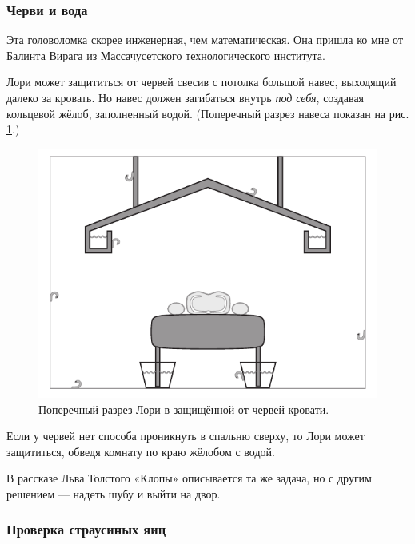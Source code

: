 
\subsubsection*{Черви и вода}

Эта головоломка скорее инженерная, чем математическая.
Она пришла ко мне от Балинта Вирага из Массачусетского технологического института.

Лори может защититься от червей свесив с потолка большой навес, выходящий далеко за кровать.
Но навес должен загибаться внутрь \emph{под себя}, создавая кольцевой жёлоб, заполненный водой.
(Поперечный разрез навеса показан на рис. \ref{pic:chervi}.)

\begin{figure}[h!]
\centering
\includegraphics[scale=0.5]{pics/chervi}
\caption{Поперечный разрез Лори в защищённой от червей кровати.}
\label{pic:chervi}
\end{figure}

Если у червей нет способа проникнуть в спальню сверху, то Лори может защититься, обведя комнату по краю жёлобом с водой.

\begin{addedbytheeditors}
В рассказе Льва Толстого «Клопы» описывается та же задача, но с другим решением --- надеть шубу и выйти на двор.
\pr
\end{addedbytheeditors} 

\subsubsection*{Проверка страусиных яиц}

